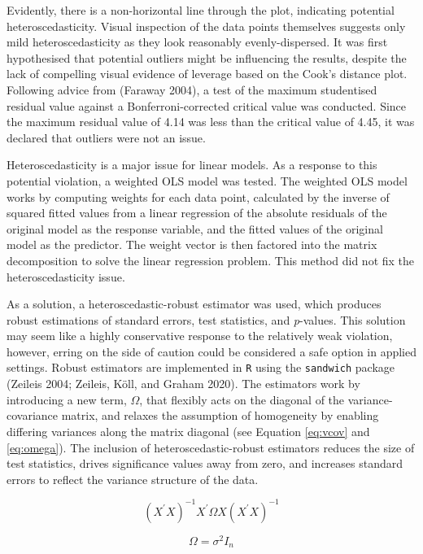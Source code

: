 \documentclass{article}
\begin{document}
Evidently, there is a non-horizontal line through the plot, indicating potential heteroscedasticity. Visual inspection of the data points themselves suggests only mild heteroscedasticity as they look reasonably evenly-dispersed. It was first hypothesised that potential outliers might be influencing the results, despite the lack of compelling visual evidence of leverage based on the Cook's distance plot. Following advice from (Faraway 2004), a test of the maximum studentised residual value against a Bonferroni-corrected critical value was conducted. Since the maximum residual value of 4.14 was less than the critical value of 4.45, it was declared that outliers were not an issue.

Heteroscedasticity is a major issue for linear models. As a response to this potential violation, a weighted OLS model was tested. The weighted OLS model works by computing weights for each data point, calculated by the inverse of squared fitted values from a linear regression of the absolute residuals of the original model as the response variable, and the fitted values of the original model as the predictor. The weight vector is then factored into the matrix decomposition to solve the linear regression problem. This method did not fix the heteroscedasticity issue.

As a solution, a heteroscedastic-robust estimator was used, which produces robust estimations of standard errors, test statistics, and \emph{p}-values. This solution may seem like a highly conservative response to the relatively weak violation, however, erring on the side of caution could be considered a safe option in applied settings. Robust estimators are implemented in \texttt{R} using the \texttt{sandwich} package (Zeileis 2004; Zeileis, Köll, and Graham 2020). The estimators work by introducing a new term, \(\Omega\), that flexibly acts on the diagonal of the variance-covariance matrix, and relaxes the assumption of homogeneity by enabling differing variances along the matrix diagonal (see Equation \eqref{eq:vcov} and \eqref{eq:omega}). The inclusion of heteroscedastic-robust estimators reduces the size of test statistics, drives significance values away from zero, and increases standard errors to reflect the variance structure of the data.

\begin{equation}
(X^{'}X)^{-1}X^{'}\Omega X (X^{'}X)^{-1} \label{eq:vcov}
\end{equation}

\begin{equation}
\Omega = \sigma^{2}I_{n} \label{eq:omega}
\end{equation}
\end{document}

